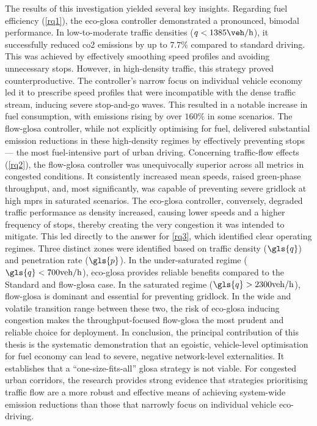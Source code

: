 \mynewline
The results of this investigation yielded several key insights. Regarding fuel efficiency (\vref{rq1}), the \ac{eco-glosa} controller demonstrated a pronounced, bimodal performance. In low-to-moderate traffic densities ($q < 1385\unit{\veh\per\hour}$), it successfully reduced \ac{co2} emissions by up to $7.7\%$ compared to standard driving. This was achieved by effectively smoothing speed profiles and avoiding unnecessary stops. However, in high-density traffic, this strategy proved counterproductive. The controller's narrow focus on individual vehicle economy led it to prescribe speed profiles that were incompatible with the dense traffic stream, inducing severe stop-and-go waves. This resulted in a notable increase in fuel consumption, with emissions rising by over $160\%$ in some scenarios. The \ac{flow-glosa} controller, while not explicitly optimising for fuel, delivered substantial emission reductions in these high-density regimes by effectively preventing stops --- the most fuel-intensive part of urban driving.
\mynewline
Concerning traffic-flow effects (\vref{rq2}), the \ac{flow-glosa} controller was unequivocally superior across all metrics in congested conditions. It consistently increased mean speeds, raised green-phase throughput, and, most significantly, was capable of preventing severe gridlock at high \acp{mpr} in saturated scenarios. The \ac{eco-glosa} controller, conversely, degraded traffic performance as density increased, causing lower speeds and a higher frequency of stops, thereby creating the very congestion it was intended to mitigate.
\mynewline
This led directly to the answer for \vref{rq3}, which identified clear operating regimes. Three distinct zones were identified based on traffic density ($\gls{q}$) and penetration rate ($\gls{p}$). In the under-saturated regime ($\gls{q} < 700\unit{veh/h}$), \ac{eco-glosa} provides reliable benefits compared to the Standard and \ac{flow-glosa} case. In the saturated regime ($\gls{q} > 2300\unit{veh/h}$), \ac{flow-glosa} is dominant and essential for preventing gridlock. In the wide and volatile transition range between these two, the risk of \ac{eco-glosa} inducing congestion makes the throughput-focused \ac{flow-glosa} the most prudent and reliable choice for deployment.
\mynewline
In conclusion, the principal contribution of this thesis is the systematic demonstration that an egoistic, vehicle-level optimisation for fuel economy can lead to severe, negative network-level externalities. It establishes that a \enquote{one-size-fits-all} \ac{glosa} strategy is not viable. For congested urban corridors, the research provides strong evidence that strategies prioritising traffic flow are a more robust and effective means of achieving system-wide emission reductions than those that narrowly focus on individual vehicle eco-driving.

